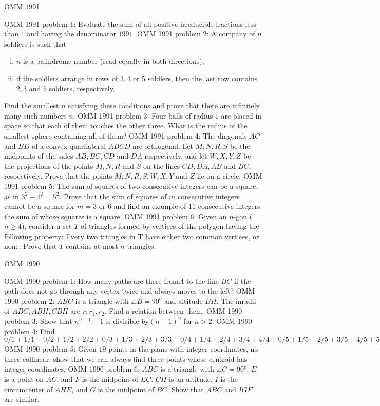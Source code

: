 OMM 1991 

OMM 1991 problem 1:  Evaluate the sum of all positive irreducible fractions less than $1$ and having the denominator $1991$. 
OMM 1991 problem 2:  A company of $n$ soldiers is such that
\begin{enumerate}[(i)]
  \item $n$ is a palindrome number (read equally in both directions);
  \item if the soldiers arrange in rows of $3, 4$ or $5$ soldiers, then the last row contains $2, 3$ and $5$ soldiers, respectively.
\end{enumerate}
Find the smallest $n$ satisfying these conditions and prove that there are infinitely many such numbers $n$. 
OMM 1991 problem 3:  Four balls of radius $1$ are placed in space so that each of them touches the other three. What is the radius of the smallest sphere containing all of them? 
OMM 1991 problem 4:  The diagonals $AC$ and $BD$ of a convex quarilateral $ABCD$ are orthogonal. Let $M,N,R,S$ be the midpoints of the sides $AB,BC,CD$ and $DA$ respectively, and let $W,X,Y,Z$ be the projections of the points $M,N,R$ and $S$ on the lines $CD,DA,AB$ and $BC$, respectively. Prove that the points $M,N,R,S,W,X,Y$ and $Z$ lie on a circle. 
OMM 1991 problem 5:  The sum of squares of two consecutive integers can be a square, as in $3^2+4^2 =5^2$. Prove that the sum of squares of $m$ consecutive integers cannot be a square for $m = 3$ or $6$ and find an example of $11$ consecutive integers the sum of whose squares is a square. 
OMM 1991 problem 6:  Given an $n$-gon ($n\ge 4$), consider a set $T$ of triangles formed by vertices of the polygon having the following property: Every two triangles in T have either two common vertices, or none. Prove that $T$ contains at most $n$ triangles. 

OMM 1990 

OMM 1990 problem 1:  How many paths are there from$ A$ to the line $BC$ if the path does not go through any vertex twice and always moves to the left? 
OMM 1990 problem 2:  $ABC$ is a triangle with $\angle B = 90^o$ and altitude $BH$. The inradii of $ABC, ABH, CBH$ are $r, r_1, r_2$. Find a relation between them. 
OMM 1990 problem 3:  Show that $n^{n-1}-1$ is divisible by$ (n-1)^2$ for $n > 2$. 
OMM 1990 problem 4:  Find $0/1 + 1/1 + 0/2 + 1/2 + 2/2 + 0/3 + 1/3 + 2/3 + 3/3 + 0/4 + 1/4 + 2/4 + 3/4 + 4/4 + 0/5 + 1/5 + 2/5 + 3/5 + 4/5 + 5/5 + 0/6 + 1/6 + 2/6 + 3/6 + 4/6 + 5/6 + 6/6$ 
OMM 1990 problem 5:  Given $19$ points in the plane with integer coordinates, no three collinear, show that we can always find three points whose centroid has integer coordinates. 
OMM 1990 problem 6:  $ABC$ is a triangle with $\angle C = 90^o$. $E$ is a point on $AC$, and $F$ is the midpoint of $EC$. $CH$ is an altitude. $I$ is the circumcenter of $AHE$, and $G$ is the midpoint of $BC$. Show that $ABC$ and $IGF$ are similar. 


